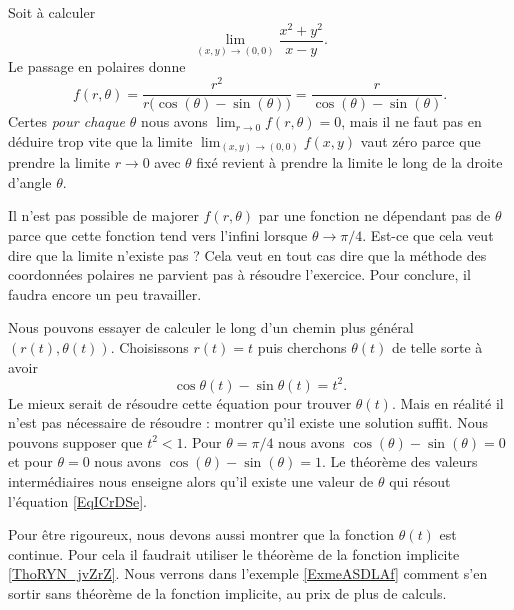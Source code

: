 \begin{example}     \label{EXooSDHDooJzDioW}
	Soit à calculer
	\begin{equation}
		\lim_{(x,y)\to(0,0)}\frac{ x^2+y^2 }{ x-y }.
	\end{equation}
	Le passage en polaires donne
	\begin{equation}
		f(r,\theta)=\frac{ r^2 }{ r\big( \cos(\theta)-\sin(\theta) \big) }=\frac{ r }{ \cos(\theta)-\sin(\theta) }.
	\end{equation}
	Certes \emph{pour chaque $\theta$} nous avons $\lim_{r\to 0} f(r,\theta)=0$, mais il ne faut pas en déduire trop vite que la limite $\lim_{(x,y)\to(0,0)}f(x,y)$ vaut zéro parce que prendre la limite $r\to 0$ avec $\theta$ fixé revient à prendre la limite le long de la droite d'angle $\theta$.

	Il n'est pas possible de majorer $f(r,\theta)$ par une fonction ne dépendant pas de $\theta$ parce que cette fonction tend vers l'infini lorsque $\theta\to\pi/4$. Est-ce que cela veut dire que la limite n'existe pas ? Cela veut en tout cas dire que la méthode des coordonnées polaires ne parvient pas à résoudre l'exercice. Pour conclure, il faudra encore un peu travailler.

    Nous pouvons essayer de calculer le long d'un chemin plus général \( (r(t),\theta(t))\). Choisissons \( r(t)=t\) puis cherchons \( \theta(t)\) de telle sorte à avoir 
    \begin{equation}        \label{EqICrDSe}
        \cos\theta(t)-\sin\theta(t)=t^2.
    \end{equation}
    Le mieux serait de résoudre cette équation pour trouver \( \theta(t)\). Mais en réalité il n'est pas nécessaire de résoudre : montrer qu'il existe une solution suffit. Nous pouvons supposer que \( t^2<1\). Pour \( \theta=\pi/4\) nous avons \( \cos(\theta)-\sin(\theta)=0\) et pour \( \theta=0\) nous avons \( \cos(\theta)-\sin(\theta)=1\). Le théorème des valeurs intermédiaires nous enseigne alors qu'il existe une valeur de \( \theta\) qui résout l'équation \eqref{EqICrDSe}.

    Pour être rigoureux, nous devons aussi montrer que la fonction \( \theta(t)\) est continue. Pour cela il faudrait utiliser le théorème de la fonction implicite \ref{ThoRYN_jvZrZ}. 
    Nous verrons dans l'exemple \ref{ExmeASDLAf} comment s'en sortir sans théorème de la fonction implicite, au prix de plus de calculs.
\end{example}


